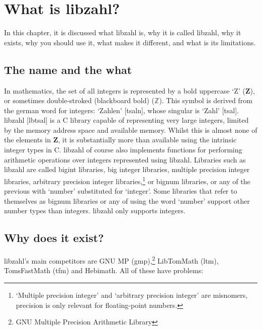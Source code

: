 \chapter{What is libzahl?}
\label{chap:What is libzahl?}

In this chapter, it is discussed what libzahl is,
why it is called libzahl, why it exists, why
you should use it, what makes it different, and
what is its limitations.

\vspace{1cm}
\minitoc


\newpage
\section{The name and the what}
\label{sec:The name and the what}

In mathematics, the set of all integers is represented
by a bold uppercase `Z' ({\bf Z}), or sometimes
double-stroked (blackboard bold) ($\mathbb{Z}$). This symbol
is derived from the german word for integers: `Zahlen'
[\textprimstress{}tsa\textlengthmark{}l\textschwa{}n],
whose singular is `Zahl' [tsa\textlengthmark{}l]. libzahl
[l\textsecstress{}\textsci{}b\textprimstress{}tsa\textlengthmark{}l]
is a C library capable of representing very large integers,
limited by the memory address space and available memory.
Whilst this is almost none of the elements in {\bf Z},
it is substantially more than available using the intrinsic
integer types in C. libzahl of course also implements
functions for performing arithmetic operations over
integers represented using libzahl. Libraries such as
libzahl are called bigint libraries, big integer libraries,
multiple precision integer libraries, arbitrary precision
integer libraries,\footnote{`Multiple precision integer'
and `arbitrary precision integer' are misnomers, precision
is only relevant for floating-point numbers.} or bignum
libraries, or any of the previous with `number' substituted
for `integer'. Some libraries that refer to themselves as bignum
libraries or any of using the word `number' support other
number types than integers. libzahl only supports integers.


\newpage
\section{Why does it exist?}
\label{sec:Why does it exist?}

libzahl's main competitors are GNU MP (gmp),\footnote{GNU
Multiple Precision Arithmetic Library} LibTomMath (ltm),
TomsFastMath (tfm) and Hebimath. All of these have problems:


